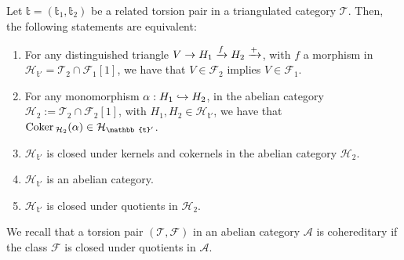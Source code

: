 \begin{corollary}
  Let $\mathbb{t}=(\mathbb{t}_1,\mathbb{t}_2)$ be a related torsion pair in a triangulated category
  $\mathcal{T}$. Then, the following statements are equivalent:
  \begin{enumerate}[label=(\alph*)]
    \item For any distinguished triangle $V\to H_1\xrightarrow{f}H_2\xrightarrow{+}$, with
    $f$ a morphism in $\mathcal{H}_{\mathbb{t}'}=\mathcal{T}_2\cap\mathcal{F}_1[1]$,
    we have that $V\in\mathcal{F}_2$ implies $V\in\mathcal{F}_1$.
    \item For any monomorphism $\alpha:H_1\hookrightarrow H_2$, in the abelian category
    $\mathcal{H}_2:=\mathcal{T}_2\cap\mathcal{F}_2[1]$, with $H_1,H_2\in\mathcal{H}_{\mathbb{t}'}$,
    we have that $\Coker_{\mathcal{H}_2}(\alpha)\in\mathcal{H}_{\mathbb{t}'}$.
    \item $\mathcal{H}_{\mathbb{t}'}$ is closed under kernels and cokernels in
    the abelian category $\mathcal{H}_2$.
    \item $\mathcal{H}_{\mathbb{t}'}$ is an abelian category.
    \item $\mathcal{H}_{\mathbb{t}'}$ is closed under quotients in $\mathcal{H}_2$.
  \end{enumerate}
\end{corollary}

We recall that a torsion pair $(\mathcal{T},\mathcal{F})$ in an abelian category
$\mathcal{A}$ is cohereditary if the class $\mathcal{F}$ is closed under quotients
in $\mathcal{A}$.

